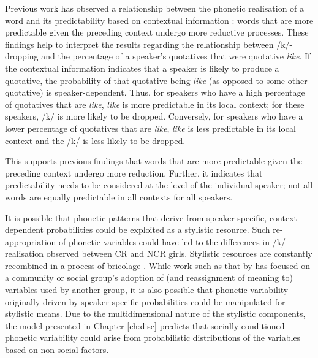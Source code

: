 Previous work has observed a relationship between the phonetic realisation of a word and its predictability based on contextual information \citep{jurafskyetal2002}: words that are more predictable given the preceding context undergo more reductive processes. These findings help to interpret the results regarding the relationship between /k/-dropping and the percentage of a speaker's quotatives that were quotative \textit{like}. If the contextual information indicates that a speaker is likely to produce a quotative, the probability of that quotative being \textit{like} (as opposed to some other quotative) is speaker-dependent. Thus, for speakers who have a high percentage of quotatives that are \textit{like}, \textit{like} is more predictable in its local context; for these speakers, /k/ is more likely to be dropped. Conversely, for speakers who have a lower percentage of quotatives that are \textit{like}, \textit{like} is less predictable in its local context and the /k/ is less likely to be dropped.

This supports previous findings that words that are more predictable given the preceding context undergo more reduction. Further, it indicates that predictability needs to be considered at the level of the individual speaker; not all words are equally predictable in all contexts for all speakers.


\largerpage
It is possible that phonetic patterns that derive from speaker-specific, context-dependent probabilities could be exploited as a stylistic resource. Such re-ap\-pro\-pri\-a\-tion of phonetic variables could have led to the differences in /k/ realisation observed between CR and NCR girls. Stylistic resources are constantly recombined in a process of bricolage \citep{hebdige1984,eckert2008}. While work such as that by \citet{milroymilroy1978} has focused on a community or social group's adoption of (and reassignment of meaning to) variables used by another group, it is also possible that phonetic variability originally driven by speaker-specific probabilities could be manipulated for stylistic means. Due to the multidimensional nature of the stylistic components, the model presented in Chapter \ref{ch:disc} predicts that socially-conditioned phonetic variability could arise from probabilistic distributions of the variables based on non-social factors.




